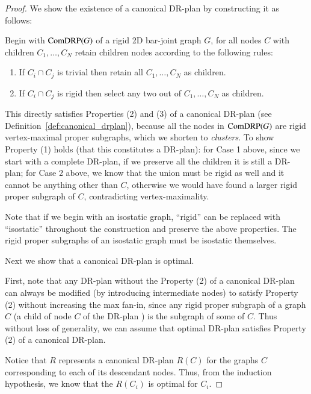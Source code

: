 \begin{proof}
We show the existence of a canonical DR-plan by constructing it as follows:

Begin with $\text{ComDRP}(G)$ of a rigid 2D bar-joint graph $G$, for all nodes $C$ with children $C_1,\ldots,C_N$  retain children nodes according to the following rules:
\begin{enumerate}
   \item If $C_i \cap C_j$ is trivial then retain all $C_1,\ldots,C_N$ as children.
   \item If $C_i \cap C_j$ is rigid then select any two out of $C_1,\ldots,C_N$ as children.
\end{enumerate}

This directly satisfies Properties (2) and (3) of a canonical DR-plan (see Definition~\ref{def:canonical_drplan}), because all the nodes in $\text{ComDRP}(G)$ are rigid vertex-maximal proper subgraphs,  which we shorten to {\em clusters}.  To show Property (1) holds (that this constitutes a DR-plan):
for Case 1 above,  since we start with a complete DR-plan, if we preserve all the children it is still a DR-plan; for Case 2 above, we know that the union must be rigid as well and it cannot be anything other than $C$, otherwise we would have found a larger rigid proper subgraph of $C$, contradicting vertex-maximality.

Note that if we begin with an isostatic graph, ``rigid'' can be replaced with ``isostatic'' throughout the construction and preserve the above properties. The rigid proper subgraphs of an isostatic graph must be isostatic themselves.

Next we show that a canonical DR-plan is optimal.

First, note  that any  DR-plan  without the Property (2) of a canonical DR-plan can always be modified (by introducing intermediate nodes) to satisfy Property (2) without  increasing the max fan-in, since any rigid proper subgraph of a graph $C$ (a child of node $C$ of the DR-plan )
is the subgraph of some  of $C$.
Thus without loss of generality, we can assume that   optimal DR-plan satisfies Property (2) of a canonical DR-plan.

Notice that $R$ represents a canonical DR-plan $R(C)$ for the graphs $C$ corresponding to each of its  descendant nodes.
Thus, from the induction hypothesis, we know that the $R(C_i)$ is optimal for $C_i$.


\end{proof}
